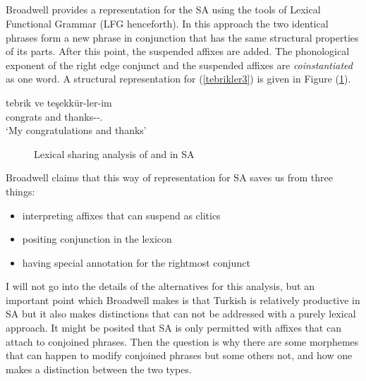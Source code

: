 \subsection{\cite{broadwell2008turkish}}
Broadwell provides a representation for the SA using the tools of Lexical Functional Grammar (LFG henceforth). In this approach the two identical phrases form a new phrase in conjunction that has the same structural properties of its parts. After this point, the suspended affixes are added. The phonological exponent of the right edge conjunct and the suspended affixes are \textit{coinstantiated} as one word. A structural representation for (\ref{tebrikler3}) is given in Figure (\ref{fig:lexicalshare}).

\begin{exe}
    \ex \label{tebrikler3}
    \gll 
    tebrik ve teşekkür-ler-im \\ congrats and thanks-{\Pl}-{\First}.{\Sg} \\ 
    \glt `My congratulations and thanks'
\end{exe}
    
\begin{figure}[hbt!]
    \centering
{}
    \caption{Lexical sharing analysis of {\Pl} and {\Poss} in SA}
    \label{fig:lexicalshare}
\end{figure}

Broadwell claims that this way of representation for SA saves us from three things:
\begin{itemize}
    \item  interpreting affixes that can suspend as clitics
    \item positing conjunction in the lexicon
    \item having special annotation for the rightmost conjunct
\end{itemize}
I will not go into the details of the alternatives for this analysis, but an important point which Broadwell makes is that Turkish is relatively productive in SA but it also makes distinctions that can not be addressed with a purely lexical approach. It might be posited that SA is only permitted with affixes that can attach to conjoined phrases. Then the question is why there are some morphemes that can happen to modify conjoined phrases but some others not, and how one makes a distinction between the two types.